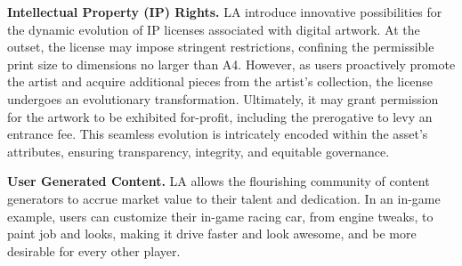 {\bf Intellectual Property (IP) Rights.}
LA introduce innovative possibilities for the
dynamic evolution of IP licenses
associated with digital artwork.
At the outset, the license may impose stringent restrictions,
confining the permissible print size to dimensions no larger than A4.
However, as users proactively promote the artist and acquire
additional pieces from the artist's collection,
the license undergoes an evolutionary transformation.
Ultimately, it may grant permission for the artwork to be exhibited for-profit,
including the prerogative to levy an entrance fee.
This seamless evolution is intricately encoded within the asset's
attributes, ensuring transparency, integrity, and equitable governance.

{\bf User Generated Content.}
LA allows the flourishing community of content generators to 
accrue market value to their talent and dedication. In an in-game example,
users can customize their in-game racing car,
from engine tweaks, to paint job and looks,
making it drive faster and look awesome,
and be more desirable for every other player.




